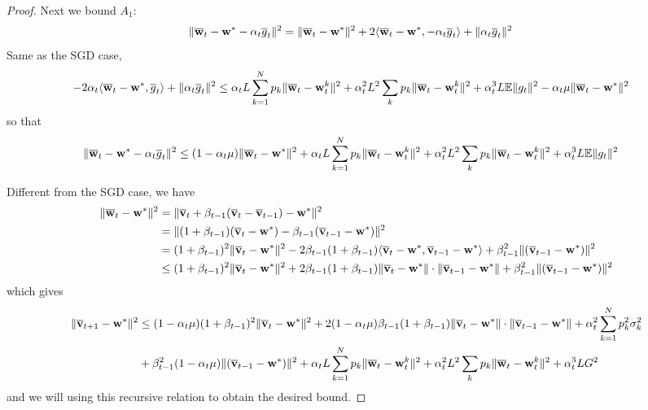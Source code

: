 \begin{proof}
Next we bound $A_{1}$: 
\begin{align*}
\|{\overline{\mathbf{w}}}_{t}-{\mathbf{w}}^{\ast}-\alpha_{t}\overline{g}_{t}\|^{2} & =\|{\overline{\mathbf{w}}}_{t}-{\mathbf{w}}^{\ast}\|^{2}+2\langle{\overline{\mathbf{w}}}_{t}-{\mathbf{w}}^{\ast},-\alpha_{t}\overline{g}_{t}\rangle+\|\alpha_{t}\overline{g}_{t}\|^{2}
\end{align*}
Same as the SGD case, 
\begin{align*}
-2\alpha_{t}\langle{\overline{\mathbf{w}}}_{t}-{\mathbf{w}}^{\ast},\overline{g}_{t}\rangle+\|\alpha_{t}\overline{g}_{t}\|^{2} & \leq\alpha_{t}L\sum_{k=1}^{N}p_{k}\|{\overline{\mathbf{w}}}_{t}-{\mathbf{w}}_{t}^{k}\|^{2}+\alpha_{t}^{2}L^{2}\sum_{k}p_{k}\|{\overline{\mathbf{w}}}_{t}-{\mathbf{w}}_{t}^{k}\|^{2}+\alpha_{t}^{3}L\mathbb{E}\|g_{t}\|^{2}-\alpha_{t}\mu\|{\overline{\mathbf{w}}}_{t}-{\mathbf{w}}^{\ast}\|^{2}
\end{align*}
so that 
\begin{align*}
\|{\overline{\mathbf{w}}}_{t}-{\mathbf{w}}^{\ast}-\alpha_{t}\overline{g}_{t}\|^{2} & \leq(1-\alpha_{t}\mu)\|{\overline{\mathbf{w}}}_{t}-{\mathbf{w}}^{\ast}\|^{2}+\alpha_{t}L\sum_{k=1}^{N}p_{k}\|{\overline{\mathbf{w}}}_{t}-{\mathbf{w}}_{t}^{k}\|^{2}+\alpha_{t}^{2}L^{2}\sum_{k}p_{k}\|{\overline{\mathbf{w}}}_{t}-{\mathbf{w}}_{t}^{k}\|^{2}+\alpha_{t}^{3}L\mathbb{E}\|g_{t}\|^{2}
\end{align*}

Different from the SGD case, we have 
\begin{align*}
\|{\overline{\mathbf{w}}}_{t}-{\mathbf{w}}^{\ast}\|^{2} & =\|{\overline{\mathbf{v}}}_{t}+\beta_{t-1}({\overline{\mathbf{v}}}_{t}-{\overline{\mathbf{v}}}_{t-1})-{\mathbf{w}}^{\ast}\|^{2}\\
& =\|(1+\beta_{t-1})({\overline{\mathbf{v}}}_{t}-{\mathbf{w}}^{\ast})-\beta_{t-1}({\overline{\mathbf{v}}}_{t-1}-{\mathbf{w}}^{\ast})\|^{2}\\
& =(1+\beta_{t-1})^{2}\|{\overline{\mathbf{v}}}_{t}-{\mathbf{w}}^{\ast}\|^{2}-2\beta_{t-1}(1+\beta_{t-1})\langle{\overline{\mathbf{v}}}_{t}-{\mathbf{w}}^{\ast},{\overline{\mathbf{v}}}_{t-1}-{\mathbf{w}}^{\ast}\rangle+\beta_{t-1}^{2}\|({\overline{\mathbf{v}}}_{t-1}-{\mathbf{w}}^{\ast})\|^{2}\\
& \leq(1+\beta_{t-1})^{2}\|{\overline{\mathbf{v}}}_{t}-{\mathbf{w}}^{\ast}\|^{2}+2\beta_{t-1}(1+\beta_{t-1})\|{\overline{\mathbf{v}}}_{t}-{\mathbf{w}}^{\ast}\|\cdot\|{\overline{\mathbf{v}}}_{t-1}-{\mathbf{w}}^{\ast}\|+\beta_{t-1}^{2}\|({\overline{\mathbf{v}}}_{t-1}-{\mathbf{w}}^{\ast})\|^{2}
\end{align*}
which gives 
\begin{align*}
\|{\overline{\mathbf{v}}}_{t+1}-{\mathbf{w}}^{\ast}\|^{2} & \leq(1-\alpha_{t}\mu)(1+\beta_{t-1})^{2}\|{\overline{\mathbf{v}}}_{t}-{\mathbf{w}}^{\ast}\|^{2}+2(1-\alpha_{t}\mu)\beta_{t-1}(1+\beta_{t-1})\|{\overline{\mathbf{v}}}_{t}-{\mathbf{w}}^{\ast}\|\cdot\|{\overline{\mathbf{v}}}_{t-1}-{\mathbf{w}}^{\ast}\|+\alpha_{t}^{2}\sum_{k=1}^{N}p_{k}^{2}\sigma_{k}^{2}\\
& +\beta_{t-1}^{2}(1-\alpha_{t}\mu)\|({\overline{\mathbf{v}}}_{t-1}-{\mathbf{w}}^{\ast})\|^{2}+\alpha_{t}L\sum_{k=1}^{N}p_{k}\|{\overline{\mathbf{w}}}_{t}-{\mathbf{w}}_{t}^{k}\|^{2}+\alpha_{t}^{2}L^{2}\sum_{k}p_{k}\|{\overline{\mathbf{w}}}_{t}-{\mathbf{w}}_{t}^{k}\|^{2}+\alpha_{t}^{3}LG^{2}
\end{align*}
and we will using this recursive relation to obtain the desired bound. 


\end{proof}
